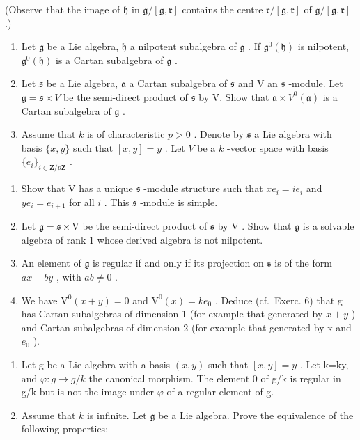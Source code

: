 (Observe that the image of \(\mathfrak{h}\) in \(\mathfrak{g}/[\mathfrak{g},\mathfrak{r}]\) contains the centre \(\mathfrak{r}/[\mathfrak{g},\mathfrak{r}]\) of \(\mathfrak{g}/[\mathfrak{g},\mathfrak{r}]\) .)

\begin{enumerate}
\def\labelenumi{\arabic{enumi})}
\setcounter{enumi}{5}
\item
  Let \(\mathfrak{g}\) be a Lie algebra, \(\mathfrak{h}\) a nilpotent subalgebra of \(\mathfrak{g}\) . If \(\mathfrak{g}^0 (\mathfrak{h})\) is nilpotent, \(\mathfrak{g}^0 (\mathfrak{h})\) is a Cartan subalgebra of \(\mathfrak{g}\) .
\item
  Let \(\mathfrak{s}\) be a Lie algebra, \(\mathfrak{a}\) a Cartan subalgebra of \(\mathfrak{s}\) and V an \(\mathfrak{s}\) -module. Let \(\mathfrak{g} = \mathfrak{s} \times V\) be the semi-direct product of \(\mathfrak{s}\) by V. Show that \(\mathfrak{a} \times V^0(\mathfrak{a})\) is a Cartan subalgebra of \(\mathfrak{g}\) .
\item
  Assume that \(k\) is of characteristic \(p > 0\) . Denote by \(\mathfrak{s}\) a Lie algebra with basis \(\{x, y\}\) such that \([x, y] = y\) . Let \(V\) be a \(k\) -vector space with basis \(\{e_i\}_{i \in \mathbf{Z}/p\mathbf{Z}}\) .
\end{enumerate}

\begin{enumerate}
\def\labelenumi{\alph{enumi})}
\item
  Show that V has a unique \(\mathfrak{s}\) -module structure such that \(xe_{i} = ie_{i}\) and \(ye_{i} = e_{i + 1}\) for all \(i\) . This \(\mathfrak{s}\) -module is simple.
\item
  Let \(\mathfrak{g} = \mathfrak{s} \times \mathrm{V}\) be the semi-direct product of \(\mathfrak{s}\) by \(\mathrm{V}\) . Show that \(\mathfrak{g}\) is a solvable algebra of rank 1 whose derived algebra is not nilpotent.
\item
  An element of \(\mathfrak{g}\) is regular if and only if its projection on \(\mathfrak{s}\) is of the form \(ax + by\) , with \(ab \neq 0\) .
\item
  We have \(\mathrm{V}^{0}(x+y)=0\) and \(\mathrm{V}^{0}(x)=ke_{0}\) . Deduce (cf.~Exerc. 6) that g has Cartan subalgebras of dimension 1 (for example that generated by \(x+y\) ) and Cartan subalgebras of dimension 2 (for example that generated by x and \(e_{0}\) ).
\end{enumerate}

\begin{enumerate}
\def\labelenumi{\arabic{enumi})}
\setcounter{enumi}{8}
\item
  Let g be a Lie algebra with a basis \((x,y)\) such that \([x,y]=y\) . Let k=ky, and \(\varphi:g\to g/k\) the canonical morphism. The element 0 of g/k is regular in g/k but is not the image under \(\varphi\) of a regular element of g.
\item
  Assume that \(k\) is infinite. Let \(\mathfrak{g}\) be a Lie algebra. Prove the equivalence of the following properties:
\end{enumerate}

